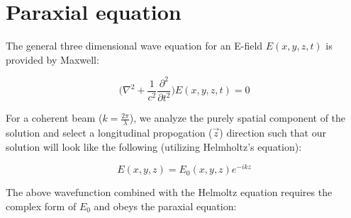 













\section{Paraxial equation} \label{sec:paraxial}

The general three dimensional wave equation for an E-field $E(x,y,z,t)$ is provided by Maxwell:

$$ \label{eq:waveq}
	\bigg( \nabla ^2 + \frac{1}{c^2} \frac{\partial^2}{\partial t^2} \bigg) E(x,y,z,t) = 0
$$

For a coherent beam ($k = \frac{2 \pi}{\lambda}$), we analyze the purely spatial component of the solution and select a longitudinal propogation ($\vec{z}$) direction such that our solution will look like the following (utilizing Helmholtz's equation):

$$
	E(x,y,z) = E_0(x,y,z) e^{-ikz}
$$

The above wavefunction combined with the Helmoltz equation requires the complex form of $E_0$ and obeys the paraxial equation:

